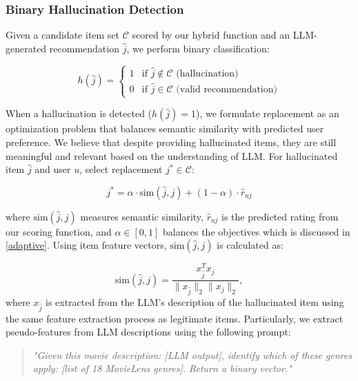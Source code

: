 \documentclass[acmsmall]{acmart}
\begin{document}
\subsubsection{Binary Hallucination Detection}

Given a candidate item set $\mathcal{C}$ scored by our hybrid function and an LLM-generated recommendation $\hat{j}$, we perform binary classification:

\begin{equation}
h(\hat{j}) = \begin{cases}
1 & \text{if } \hat{j} \notin \mathcal{C} \text{ (hallucination)} \\
0 & \text{if } \hat{j} \in \mathcal{C} \text{ (valid recommendation)}
\end{cases}
\label{eq:hallucination_detection}
\end{equation}



When a hallucination is detected ($h(\hat{j}) = 1$), we formulate replacement as an optimization problem that balances semantic similarity with predicted user preference. We believe that despite providing hallucinated items, they are still meaningful and relevant based on the understanding of LLM. 
For hallucinated item $\hat{j}$ and user $u$, select replacement $j^* \in \mathcal{C}$:

\begin{equation}
j^* = \alpha \cdot \text{sim}(\hat{j}, j) + (1-\alpha) \cdot \hat{r}_{uj}
\label{eq:replacement_optimization}
\end{equation}

where $\text{sim}(\hat{j}, j)$ measures semantic similarity, $\hat{r}_{uj}$ is the predicted rating from our scoring function, and $\alpha \in [0,1]$ balances the objectives which is discussed in \ref{adaptive}. Using item feature vectors, $\text{sim}(\hat{j}, j)$ is calculated as: 

\begin{equation}
\text{sim}(\hat{j}, j) = \frac{x_{\hat{j}}^T x_j}{\|x_{\hat{j}}\|_2 \|x_j\|_2},
\label{eq:content_similarity}
\end{equation}
where $x_{\hat{j}}$ is extracted from the LLM's description of the hallucinated item using the same feature extraction process as legitimate items.
Particularly, we extract pseudo-features from LLM descriptions using the following prompt:
\begin{quote}
\textit{"Given this movie description: [LLM output], identify which of these genres apply: [list of 18 MovieLens genres]. Return a binary vector."}
\end{quote}
\end{document}
